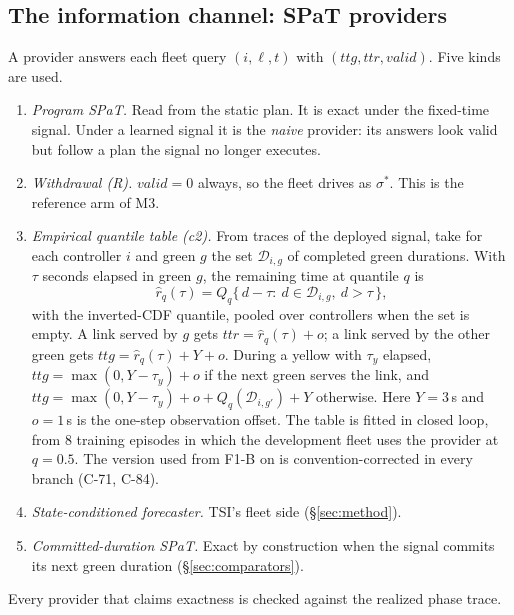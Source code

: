 \documentclass[11pt]{article}
\begin{document}
\subsection{The information channel: SPaT providers}\label{sec:providers}
A provider answers each fleet query $(i,\ell,t)$ with $(\mathit{ttg},\mathit{ttr},\mathit{valid})$. Five kinds are used.
\begin{enumerate}\setlength\itemsep{1pt}
\item \emph{Program SPaT.} Read from the static plan. It is exact under the fixed-time signal. Under a learned signal it is the
\emph{naive} provider: its answers look valid but follow a plan the signal no longer executes.
\item \emph{Withdrawal (R).} $\mathit{valid}=0$ always, so the fleet drives as $\sigma^*$. This is the reference arm of M3.
\item \emph{Empirical quantile table (c2).} From traces of the deployed signal, take for each controller $i$ and green $g$ the set
$\mathcal D_{i,g}$ of completed green durations. With $\tau$ seconds elapsed in green $g$, the remaining time at quantile $q$ is
\begin{equation}
\hat r_q(\tau)=Q_q\{\,d-\tau:\ d\in\mathcal D_{i,g},\ d>\tau\,\},
\end{equation}
with the inverted-CDF quantile, pooled over controllers when the set is empty. A link served by $g$ gets $\mathit{ttr}=\hat r_q(\tau)+o$;
a link served by the other green gets $\mathit{ttg}=\hat r_q(\tau)+Y+o$. During a yellow with $\tau_y$ elapsed,
$\mathit{ttg}=\max(0,Y-\tau_y)+o$ if the next green serves the link, and $\mathit{ttg}=\max(0,Y-\tau_y)+o+Q_q(\mathcal D_{i,g'})+Y$
otherwise. Here $Y=3$\,s and $o=1$\,s is the one-step observation offset. The table is fitted in closed loop, from 8 training episodes in
which the development fleet uses the provider at $q=0.5$. The version used from F1-B on is convention-corrected in every branch (C-71,
C-84).
\item \emph{State-conditioned forecaster.} TSI's fleet side (§\ref{sec:method}).
\item \emph{Committed-duration SPaT.} Exact by construction when the signal commits its next green duration
(§\ref{sec:comparators}).
\end{enumerate}
Every provider that claims exactness is checked against the realized phase trace.
\end{document}
